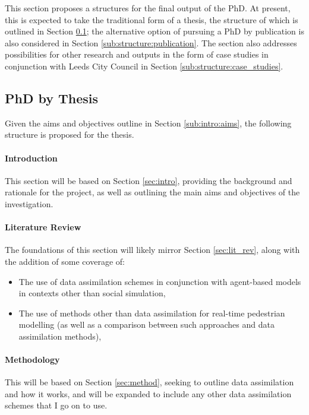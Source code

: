 This section proposes a structures for the final output of the PhD.
At present, this is expected to take the traditional form of a thesis, the
structure of which is outlined in Section \ref{sub:structure:thesis}; the
alternative option of pursuing a PhD by publication is also considered in
Section \ref{sub:structure:publication}.
The section also addresses possibilities for other research and outputs in the
form of case studies in conjunction with Leeds City Council in Section
\ref{sub:structure:case_studies}.

\subsection{PhD by Thesis}\label{sub:structure:thesis}

Given the aims and objectives outline in Section \ref{sub:intro:aims}, the
following structure is proposed for the thesis.

\paragraph{Introduction}

This section will be based on Section \ref{sec:intro}, providing the background
and rationale for the project, as well as outlining the main aims and objectives
of the investigation.


\paragraph{Literature Review}

The foundations of this section will likely mirror Section \ref{sec:lit_rev},
along with the addition of some coverage of:
\begin{itemize}
    \item The use of data assimilation schemes in conjunction with
        agent-based models in contexts other than social simulation,
    \item The use of methods other than data assimilation for real-time
        pedestrian modelling (as well as a comparison between such
        approaches and data assimilation methods),
\end{itemize}

\paragraph{Methodology}

This will be based on Section \ref{sec:method}, seeking to outline data
assimilation and how it works, and will be expanded to include any other data
assimilation schemes that I go on to use.

